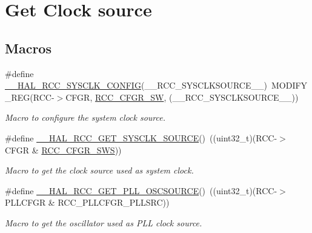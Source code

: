 \hypertarget{group___r_c_c___get___clock__source}{}\section{Get Clock source}
\label{group___r_c_c___get___clock__source}
\subsection*{Macros}
\begin{DoxyCompactItemize}
\item 
\#define \hyperlink{group___r_c_c___get___clock__source_ga32f72b8c5b7e97b415867c57f9fafed6}{\+\_\+\+\_\+\+H\+A\+L\+\_\+\+R\+C\+C\+\_\+\+S\+Y\+S\+C\+L\+K\+\_\+\+C\+O\+N\+F\+IG}(\+\_\+\+\_\+\+R\+C\+C\+\_\+\+S\+Y\+S\+C\+L\+K\+S\+O\+U\+R\+C\+E\+\_\+\+\_\+)~M\+O\+D\+I\+F\+Y\+\_\+\+R\+EG(R\+CC-\/$>$C\+F\+GR, \hyperlink{group___peripheral___registers___bits___definition_ga0eea5e5f7743a7e8995b8beeb18355c1}{R\+C\+C\+\_\+\+C\+F\+G\+R\+\_\+\+SW}, (\+\_\+\+\_\+\+R\+C\+C\+\_\+\+S\+Y\+S\+C\+L\+K\+S\+O\+U\+R\+C\+E\+\_\+\+\_\+))
\begin{DoxyCompactList}\small\item\em Macro to configure the system clock source. \end{DoxyCompactList}\item 
\#define \hyperlink{group___r_c_c___get___clock__source_gac99c2453d9e77c8b457acc0210e754c2}{\+\_\+\+\_\+\+H\+A\+L\+\_\+\+R\+C\+C\+\_\+\+G\+E\+T\+\_\+\+S\+Y\+S\+C\+L\+K\+\_\+\+S\+O\+U\+R\+CE}()~((uint32\+\_\+t)(R\+CC-\/$>$C\+F\+GR \& \hyperlink{group___peripheral___registers___bits___definition_ga15bf2269500dc97e137315f44aa015c9}{R\+C\+C\+\_\+\+C\+F\+G\+R\+\_\+\+S\+WS}))
\begin{DoxyCompactList}\small\item\em Macro to get the clock source used as system clock. \end{DoxyCompactList}\item 
\#define \hyperlink{group___r_c_c___get___clock__source_ga3ea1390f8124e2b3b8d53e95541d6e53}{\+\_\+\+\_\+\+H\+A\+L\+\_\+\+R\+C\+C\+\_\+\+G\+E\+T\+\_\+\+P\+L\+L\+\_\+\+O\+S\+C\+S\+O\+U\+R\+CE}()~((uint32\+\_\+t)(R\+CC-\/$>$P\+L\+L\+C\+F\+GR \& R\+C\+C\+\_\+\+P\+L\+L\+C\+F\+G\+R\+\_\+\+P\+L\+L\+S\+RC))
\begin{DoxyCompactList}\small\item\em Macro to get the oscillator used as P\+LL clock source. \end{DoxyCompactList}\end{DoxyCompactItemize}


